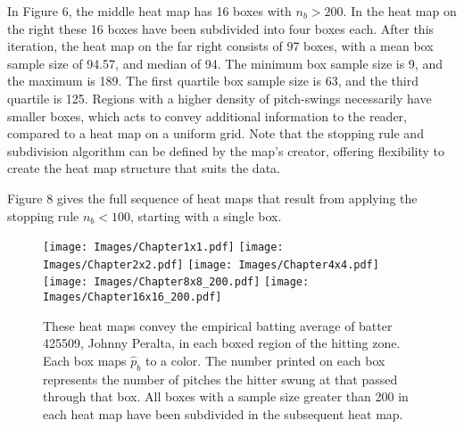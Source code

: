 \documentclass{article}
\begin{document}
In Figure 6, the middle heat map has 16 boxes with $n_{b} > 200$. In the heat map on the right these 16 boxes have been subdivided into four boxes each. After this iteration, the heat map on the far right consists of 97 boxes, with a mean box sample size of 94.57, and median of 94. The minimum box sample size is 9, and the maximum is 189. The first quartile box sample size is 63, and the third quartile is 125. Regions with a higher density of pitch-swings necessarily have smaller boxes, which acts to convey additional information to the reader, compared to a heat map on a uniform grid. Note that the stopping rule and subdivision algorithm can be defined by the map's creator, offering flexibility to create the heat map structure that suits the data. 

Figure 8 gives the full sequence of heat maps that result from applying the stopping rule $n_{b} < 100$, starting with a single box.
        \begin{figure}[H]
      	\centering
      	\texttt{[image: Images/Chapter1x1.pdf]}
      	\texttt{[image: Images/Chapter2x2.pdf]}
      	\texttt{[image: Images/Chapter4x4.pdf]}
      	\texttt{[image: Images/Chapter8x8\_200.pdf]} 
      	\texttt{[image: Images/Chapter16x16\_200.pdf]} 
      	\caption{These heat maps convey the empirical batting average of batter 425509, Johnny Peralta, in each boxed region of the hitting zone. Each box maps $\hat{p}_{b}$ to a color. The number printed on each box represents the number of pitches the hitter swung at that passed through that box. All boxes with a sample size greater than 200 in each heat map have been subdivided in the subsequent heat map.}
      	\end{figure}
\end{document}
